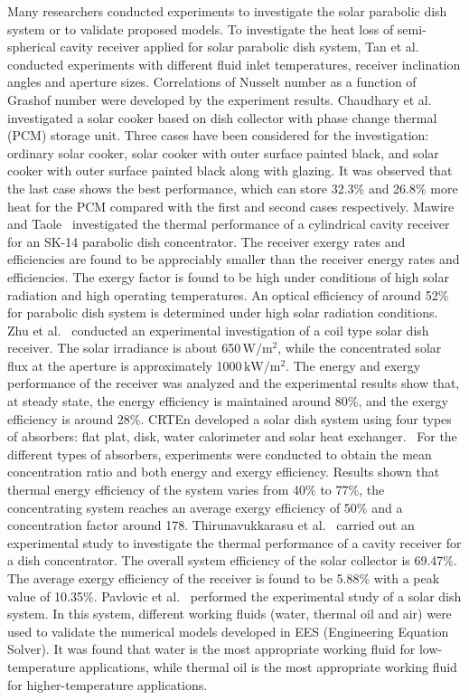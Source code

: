 Many researchers conducted experiments to investigate the solar parabolic dish system or to validate proposed models.
To investigate the heat loss of semi-spherical cavity receiver applied for solar parabolic dish system, Tan et al.~\cite{Tan2014b} conducted experiments with different fluid inlet temperatures, receiver inclination angles and aperture sizes. Correlations of Nusselt number as a function of Grashof number were developed by the experiment results.
Chaudhary et al.~\cite{Chaudhary2013} investigated a solar cooker based on dish collector with phase change thermal (PCM) storage unit. Three cases have been considered for the investigation: ordinary solar cooker, solar cooker with outer surface painted black, and solar cooker with outer surface painted black along with glazing. It was observed that the last case shows the best performance, which can store 32.3\% and 26.8\% more heat for the PCM compared with the first and second cases respectively.
Mawire and Taole~\cite{Mawire2014} investigated the thermal performance of a cylindrical cavity receiver for an SK-14 parabolic dish concentrator. The receiver exergy rates and efficiencies are found to be appreciably smaller than the receiver energy rates and efficiencies. The exergy factor is found to be high under conditions of high solar radiation and high operating temperatures. An optical efficiency of around 52\% for parabolic dish system is determined under high solar radiation conditions.
Zhu et al.~\cite{Zhu2015} conducted an experimental investigation of a coil type solar dish receiver. The solar irradiance is about 650$\,\mathrm{W/m^2}$, while the concentrated solar flux at the aperture is approximately 1000$\,\mathrm{kW/m^2}$. The energy and exergy performance of the receiver was analyzed and the experimental results show that, at steady state, the energy efficiency is maintained around 80\%, and the exergy efficiency is around 28\%. 
CRTEn developed a solar dish system using four types of absorbers: flat plat, disk, water calorimeter and solar heat exchanger.~\cite{Skouri2013} For the different types of absorbers, experiments were conducted to obtain the mean concentration ratio and both energy and exergy efficiency. Results shown that thermal energy efficiency of the system varies from 40\% to 77\%, the concentrating system reaches an average exergy efficiency of 50\% and a concentration factor around 178.
Thirunavukkarasu et al.~\cite{Thirunavukkarasu2017} carried out an experimental study to investigate the thermal performance of a cavity receiver for a dish concentrator. The overall system efficiency of the solar collector is 69.47\%. The average exergy efficiency of the receiver is found to be 5.88\% with a peak value of 10.35\%.
Pavlovic et al.~\cite{Pavlovic2017} performed the experimental study of a solar dish system. In this system, different working fluids (water, thermal oil and air) were used to validate the numerical models developed in EES (Engineering Equation Solver). It was found that water is the most appropriate working fluid for low-temperature applications, while thermal oil is the most appropriate working fluid for higher-temperature applications.


